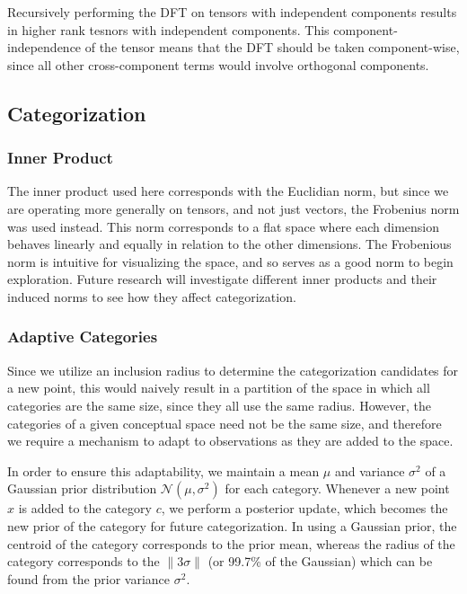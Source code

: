 \documentclass[runningheads]{llncs}
\begin{document}
Recursively performing the DFT on tensors with independent components results in higher rank tesnors with independent components.  This component-independence of the tensor means that the DFT should be taken component-wise, since all other cross-component terms would involve orthogonal components.


\subsection{Categorization}

\subsubsection{Inner Product}
The inner product used here corresponds with the Euclidian norm, but since we are operating more generally on tensors, and not just vectors, the Frobenius norm was used instead.  This norm corresponds to a flat space where each dimension behaves linearly and equally in relation to the other dimensions.  The Frobenious norm is intuitive for visualizing the space, and so serves as a good norm to begin exploration.  Future research will investigate different inner products and their induced norms to see how they affect categorization.


\subsubsection{Adaptive Categories}

Since we utilize an inclusion radius to determine the categorization candidates for a new point, this would naively result in a partition of the space in which all categories are the same size, since they all use the same radius.  However, the categories of a given conceptual space need not be the same size, and therefore we require  a mechanism to adapt to observations as they are added to the space.

In order to ensure this adaptability, we maintain a mean $\mu$ and variance $\sigma^2$ of a Gaussian prior distribution $\mathcal{N}(\mu,\sigma^2)$ for each category.  Whenever a new point $x$ is added to the category $c$, we perform a posterior update, which becomes the new prior of the category for future categorization.  In using a Gaussian prior, the centroid of the category corresponds to the prior mean, whereas the radius of the category corresponds to the $\|3\sigma\|$ (or 99.7\% of the Gaussian) which can be found from the prior variance $\sigma^2$.
\end{document}
